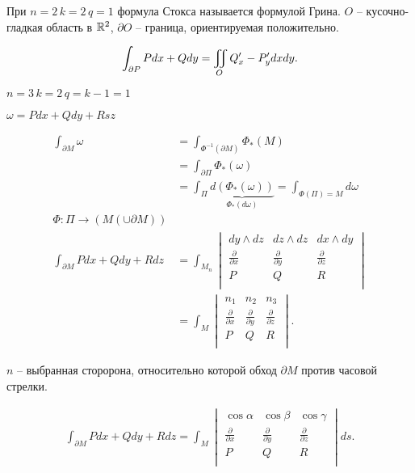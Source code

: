 \begin{note}
    При $n=2\,k=2\,q=1$ формула Стокса называется формулой Грина.  $O$ -- кусочно-гладкая область в  $\mathbb{R}^2$, $\partial O$ -- граница, ориентируемая положительно.

    \[
        \int _{\partial P}Pdx+Qdy = \iint_O Q^{\prime}_x - P^{\prime}_ydxdy 
    .\] 
\end{note}
\begin{note}
    $n=3\,k=2\,q=k-1=1$

     $\omega = Pdx+Qdy+Rsz$


 \begin{align*}
     \int_{\partial M}\omega &= \int_{\Phi^{-1}\left( \partial M \right) } \Phi_*(M)\\ 
                             &= \int_{\partial \Pi}\Phi_*\left( \omega \right)  \\
                             &= \int_{\Pi}\underbrace{d\left( \Phi_*(\omega) \right)}_{\Phi_*\left( d\omega \right) } = \int_{\Phi\left( \Pi \right) = M } d\omega\\
                             \Phi:\Pi \to \left( M\left( \cup \partial M \right)  \right) \\
     \int_{\partial M}Pdx+Qdy+Rdz &= \int_{M_n} 
     \begin{vmatrix}
         dy\wedge dz & dz\wedge dz & dx\wedge dy\\
         \frac{\partial }{\partial x}&\frac{\partial }{\partial y}&\frac{\partial }{\partial z}\\
         P&Q&R\\
     \end{vmatrix}\\
     &= \int_{M} 
     \begin{vmatrix}
         n_1&n_2&n_3\\
         \frac{\partial }{\partial x}&\frac{\partial }{\partial y}&\frac{\partial }{\partial z}\\
         P&Q&R\\
     \end{vmatrix}
.\end{align*}           

$n$ -- выбранная сторорона, относительно которой обход  $\partial M$ против часовой стрелки.

\begin{align*}
    \int_{\partial M}Pdx+Qdy+Rdz = \int_M 
    \begin{vmatrix}
        \cos \alpha&\cos \beta&\cos \gamma\\
        \frac{\partial }{\partial x}&\frac{\partial }{\partial y}&\frac{\partial }{\partial z}\\
        P&Q&R\\
    \end{vmatrix}ds
.\end{align*}


\end{note}
